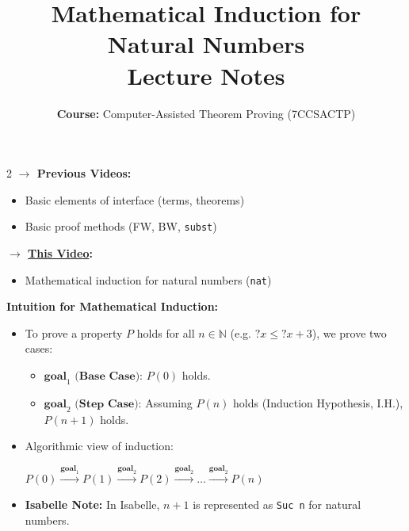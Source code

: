 \documentclass[10pt,a4paper]{article}
\title{\textbf{\huge Mathematical Induction for Natural Numbers}\\[0.3em]
\large Lecture Notes}
\author{\textbf{Course:} Computer-Assisted Theorem Proving (7CCSACTP)}
\date{}
\begin{document}
\maketitle
\vspace{-1.5em}

\begin{tcolorbox}[title=Context \& Induction Intuition]
\begin{multicols}{2}
\textbf{$\rightarrow$ Previous Videos:}
\begin{itemize}[leftmargin=1.2em, itemsep=2pt]
    \item Basic elements of interface (terms, theorems)
    \item Basic proof methods (FW, BW, \texttt{subst})
\end{itemize}

\textbf{$\rightarrow$ \underline{This Video}:}
\begin{itemize}[leftmargin=1.2em, itemsep=2pt]
    \item Mathematical induction for natural numbers (\texttt{nat})
\end{itemize}

\columnbreak

\textbf{Intuition for Mathematical Induction:}
\begin{itemize}[leftmargin=1.2em, itemsep=2pt]
    \item To prove a property $P$ holds for all $n \in \mathbb{N}$ (e.g. $?x \le ?x + 3$), we prove two cases:
    \begin{itemize}[leftmargin=1em, label=$\bullet$]
        \item $\textbf{goal}_1 \textbf{ (Base Case):}$ $P(0)$ holds.
        \item $\textbf{goal}_2 \textbf{ (Step Case):}$ Assuming $P(n)$ holds (Induction Hypothesis, \textsf{I.H.}), $P(n+1)$ holds.
    \end{itemize}
    \item Algorithmic view of induction:
    \begin{center}
    $P(0) \xrightarrow{\textbf{goal}_1} P(1) \xrightarrow{\textbf{goal}_2} P(2) \xrightarrow{\textbf{goal}_2} \dots \xrightarrow{\textbf{goal}_2} P(n)$
    \end{center}
    \item \textbf{Isabelle Note:} In Isabelle, $n+1$ is represented as \texttt{Suc n} for natural numbers.
\end{itemize}
\end{multicols}
\end{tcolorbox}
\end{document}
